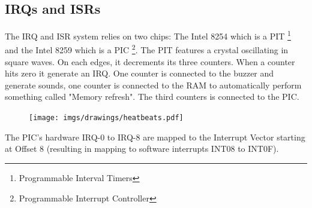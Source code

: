 \subsection{IRQs and ISRs}
The IRQ and ISR system relies on two chips: The Intel 8254 which is a PIT \footnote{Programmable Interval Timers} and the Intel 8259 which is a PIC \footnote{Programmable Interrupt Controller}. The PIT features a crystal oscillating in square waves. On each edges, it decrements its three counters. When a counter hits zero it generate an IRQ. One counter is connected to the buzzer and generate sounds, one counter is connected to the RAM to automatically perform something called "Memory refresh".  The third counters is connected to the PIC. 
\par
\begin{figure}[H]
\centering
 \texttt{[image: imgs/drawings/heatbeats.pdf]}
 \end{figure}
\par

The PIC's hardware IRQ-0 to IRQ-8 are mapped to the Interrupt Vector starting at Offset 8 (resulting in mapping to software interrupts INT08 to INT0F).\\

